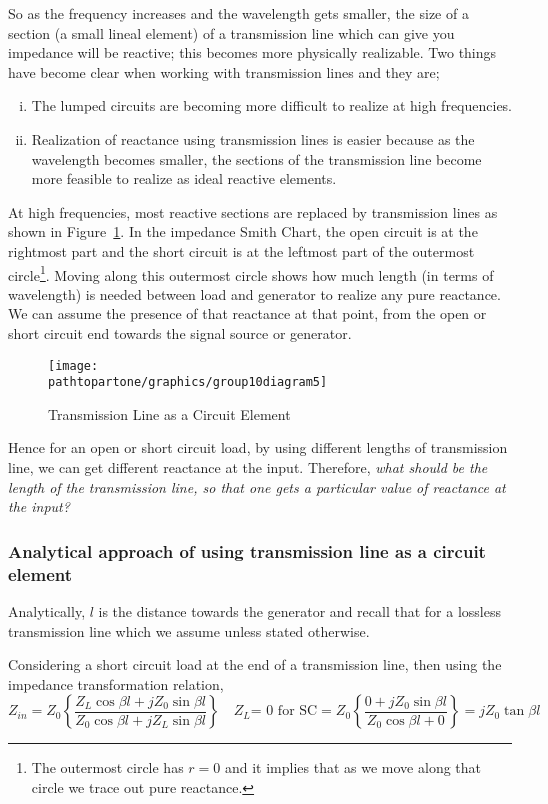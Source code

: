 So as the frequency increases and the wavelength gets smaller, the size of a section (a small lineal element) of a transmission line which can give you impedance will be reactive; this becomes more physically realizable. Two things have become clear when working with transmission
lines and they are;
\begin{enumerate}[(i)]
\item The lumped circuits are becoming more difficult to realize at high frequencies.
\item Realization of reactance using transmission lines is easier because as the wavelength becomes smaller, the sections of the transmission line become more feasible to realize as ideal reactive elements.
\end{enumerate}
At high frequencies, most reactive sections are replaced by transmission lines as shown in Figure~\ref{fig:group10diagram5}. In the impedance Smith Chart, the open circuit is at the rightmost part and the short circuit is at the leftmost part of the outermost circle\footnote{
The outermost circle has $r = 0$ and it implies that as we move along that circle we trace out pure reactance.
}. Moving along this outermost circle shows how much length (in terms of wavelength) is needed between load and generator to realize any pure reactance. We can assume the presence of that reactance at that point, from the open or short circuit end towards the signal source or generator.
\begin{figure}[h]
\centering
\texttt{[image: \\pathtopartone/graphics/group10diagram5]}
\caption{Transmission Line as a Circuit Element}
\label{fig:group10diagram5}
\end{figure}

Hence for an open or short circuit load, by using different lengths of transmission line, we can get different reactance at the input. Therefore, \emph{what should be the length of the transmission line, so that one gets a particular value of reactance at the input?}

\subsubsection{Analytical approach of using transmission line as a circuit element}
Analytically, $l$ is the distance towards the generator and recall that for a lossless transmission line which we assume unless stated otherwise.

Considering a short circuit load at the end of a transmission line, then using the impedance transformation relation,
\begin{dmath}
Z_{in} = Z_0 \left\lbrace\frac{Z_{L}\cos\beta l + jZ_0\sin\beta l}{Z_0\cos\beta l + jZ_{L}\sin\beta l}\right\rbrace\quad Z_{L} \text{= 0 for SC} 
= Z_0 \left\lbrace \frac{0 + jZ_0\sin\beta l}{Z_0\cos\beta l + 0}\right\rbrace = jZ_0\tan\beta l
\label{eqn:zinshortcircuit}
\end{dmath}

